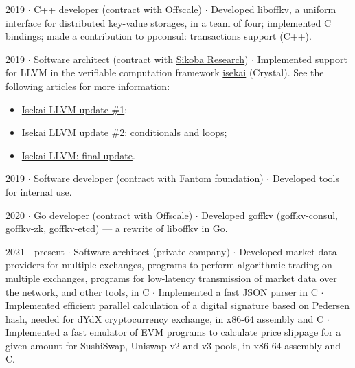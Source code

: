 \documentclass[10pt]{article}
\begin{document}
\medskip

2019 $\cdot$ C++ developer (contract with \href{https://offscale.io}{Offscale}) $\cdot$ Developed \href{https://github.com/offscale/liboffkv}{liboffkv}, a uniform interface for distributed key-value storages, in a team of four; implemented C bindings; made a contribution to \href{https://github.com/oliora/ppconsul}{ppconsul}: transactions support (C++).

\medskip

2019 $\cdot$ Software architect (contract with \href{https://research.sikoba.com}{Sikoba Research}) $\cdot$ Implemented support for LLVM in the verifiable computation framework \href{https://github.com/sikoba/isekai}{isekai} (Crystal).
See the following articles for more information:
\begin{itemize}
    \item \href{https://medium.com/sikoba-network/isekai-technical-update-llvm-d5003fc8f009}{Isekai LLVM update \#1};
    \item \href{https://medium.com/sikoba-network/isekai-llvm-update-2-conditionals-and-loops-81296a0eccbf}{Isekai LLVM update \#2: conditionals and loops};
    \item \href{https://medium.com/sikoba-network/isekai-llvm-final-update-894fb6863fcf}{Isekai LLVM: final update}.
\end{itemize}

\medskip

2019 $\cdot$ Software developer (contract with \href{https://fantom.foundation}{Fantom foundation}) $\cdot$ Developed tools for internal use.

\medskip

2020 $\cdot$ Go developer (contract with \href{https://offscale.io}{Offscale}) $\cdot$ Developed
\href{https://github.com/offscale/goffkv}{goffkv}
(\href{https://github.com/offscale/goffkv-consul}{goffkv-consul},
\href{https://github.com/offscale/goffkv-zk}{goffkv-zk},
\href{https://github.com/offscale/goffkv-etcd}{goffkv-etcd}) ---
a rewrite of \href{https://github.com/offscale/liboffkv}{liboffkv} in Go.

\medskip

2021---present $\cdot$ Software architect (private company) $\cdot$
Developed market data providers for multiple exchanges,
programs to perform algorithmic trading on multiple exchanges,
programs for low-latency transmission of market data over the network,
and other tools,
in C
$\cdot$
Implemented a fast JSON parser in C
$\cdot$
Implemented efficient parallel calculation of a digital signature based on
Pedersen hash, needed for dYdX cryptocurrency exchange,
in x86-64 assembly and C
$\cdot$
Implemented a fast emulator of EVM programs to calculate price slippage for a given amount for SushiSwap, Uniswap v2 and v3 pools, in x86-64 assembly and C.
\end{document}
